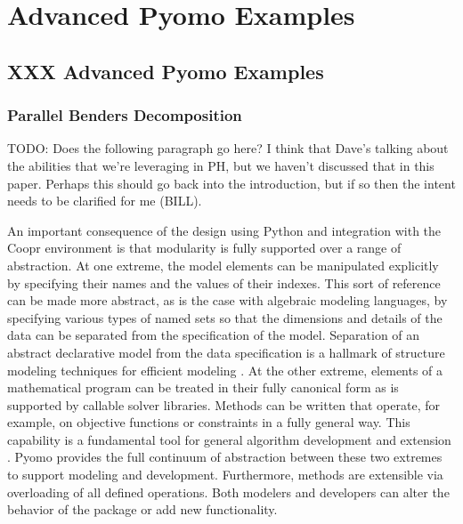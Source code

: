 \chapter{Advanced Pyomo Examples}

\section{XXX Advanced Pyomo Examples}

\subsection{Parallel Benders Decomposition}

TODO: Does the following paragraph go here?  I think that Dave's talking
about the abilities that we're leveraging in PH, but we haven't discussed
that in this paper.  Perhaps this should go back into the introduction,
but if so then the intent needs to be clarified for me (BILL).

An important consequence of the design using Python and integration
with the Coopr environment is that modularity is fully supported over
a range of abstraction.  At one extreme, the model elements can be
manipulated explicitly by specifying their names and the values of
their indexes. This sort of reference can be made more abstract, as
is the case with algebraic modeling languages, by specifying various
types of named sets so that the dimensions and details of the data
can be separated from the specification of the model. Separation of an
abstract declarative model from the data specification is a hallmark of
structure modeling techniques for efficient modeling \citep{Geoffrion}.
At the other extreme, elements of a mathematical program can be treated in
their fully canonical form as is supported by callable solver libraries.
Methods can be written that operate, for example, on objective functions
or constraints in a fully general way. This capability is a fundamental
tool for general algorithm development and extension \citep{Marsten}.
Pyomo provides the full continuum of abstraction between these two
extremes to support modeling and development.  Furthermore, methods are
extensible via overloading of all defined operations. Both modelers and
developers can alter the behavior of the package or add new functionality.


